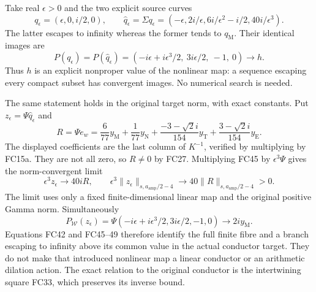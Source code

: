 \documentclass[11pt]{article}
\begin{document}
Take real $\epsilon>0$ and the two explicit source curves
\[
 q_\epsilon=(\epsilon,0,i/2,0),\qquad
 \widehat q_\epsilon=\Sigma q_\epsilon
 =(-\epsilon,2i/\epsilon,6i/\epsilon^2-i/2,40i/\epsilon^3).
 \tag{FC45}
\]
The latter escapes to infinity whereas the former tends to
$q_{\mathrm M}$. Their identical images are
\[
 P(q_\epsilon)=P(\widehat q_\epsilon)
 =(-i\epsilon+i\epsilon^3/2,\ 3i\epsilon/2,\ -1,\ 0)
 \longrightarrow h.
 \tag{FC46}
\]
Thus $h$ is an explicit nonproper value of the nonlinear map: a
sequence escaping every compact subset has convergent images.
No numerical search is needed.

The same statement holds in the original target norm, with exact
constants. Put $z_\epsilon=\Psi\widehat q_\epsilon$ and
\[
 R=\Psi e_w=
 \frac6{77}y_{\mathrm M}+\frac1{77}y_{\mathrm N}
 +\frac{-3-\sqrt2i}{154}y_{\mathrm T}
 +\frac{3-\sqrt2i}{154}y_{\mathrm E}.
 \tag{FC47}
\]
The displayed coefficients are the last column of $K^{-1}$, verified
by multiplying by FC15a. They are not all zero, so $R\ne0$ by FC27.
Multiplying FC45 by $\epsilon^3\Psi$ gives the norm-convergent limit
\[
 \epsilon^3 z_\epsilon\longrightarrow40iR,\qquad
 \epsilon^3\|z_\epsilon\|_{s,a_{\mathrm{amp}}/2-4}
 \longrightarrow40\|R\|_{s,a_{\mathrm{amp}}/2-4}>0.
 \tag{FC48}
\]
The limit uses only a fixed finite-dimensional linear map and the
original positive Gamma norm. Simultaneously
\[
 P_{\mathcal W}(z_\epsilon)
 =\Psi(-i\epsilon+i\epsilon^3/2,3i\epsilon/2,-1,0)
 \longrightarrow2iy_{\mathrm M}.
 \tag{FC49}
\]
Equations FC42 and FC45--49 therefore identify the full finite fibre
and a branch escaping to infinity above its common value in the
actual conductor target. They do not make that introduced nonlinear
map a linear conductor or an arithmetic dilation action. The exact
relation to the original conductor is the intertwining square FC33,
which preserves its inverse bound.
\end{document}
